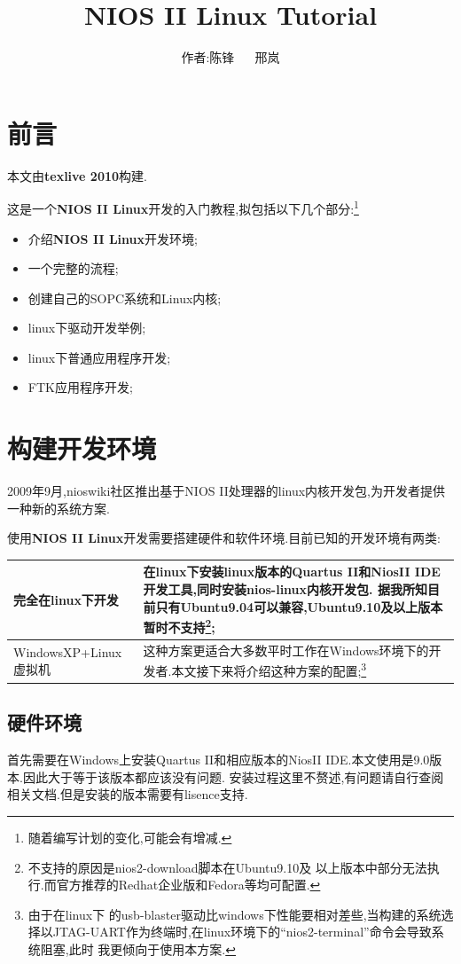 \documentclass[12pt,a4paper]{article}
\title{NIOS II Linux Tutorial}
\author{作者:陈锋 \ {}\ {} 邢岚}
\begin{document}
\thispagestyle{empty}
\maketitle{}
\section{前言}
本文由\textbf{texlive 2010}构建.

这是一个\textbf{NIOS II Linux}开发的入门教程,拟包括以下几个部分:\footnote{随着编写计划的变化,可能会有增减.}
\begin{itemize}
\item 介绍\textbf{NIOS II Linux}开发环境;
\item 一个完整的流程;
\item 创建自己的SOPC系统和Linux内核;
\item linux下驱动开发举例;
\item linux下普通应用程序开发;
\item FTK应用程序开发;
\end{itemize}
\newpage{}
\section{构建开发环境}
2009年9月,nioswiki社区推出基于NIOS II处理器的linux内核开发包,为开发者提供一种新的系统方案.

使用\textbf{NIOS II Linux}开发需要搭建硬件和软件环境.目前已知的开发环境有两类:
\begin{table}[!hbtp]
\centering
\begin{tabular}{|l|p{}|}
\hline
完全在linux下开发 & 在linux下安装linux版本的Quartus II和NiosII IDE开发工具,同时安装nios-linux内核开发包.
据我所知目前只有\textbf{Ubuntu9.04}可以兼容,Ubuntu9.10及以上版本暂时不支持\footnote{不支持的原因是nios2-download脚本在Ubuntu9.10及
以上版本中部分无法执行.而官方推荐的Redhat企业版和Fedora等均可配置.};\\
\hline
WindowsXP+Linux虚拟机 & 这种方案更适合大多数平时工作在Windows环境下的开发者.本文接下来将介绍这种方案的配置;\footnote{由于在linux下
的usb-blaster驱动比windows下性能要相对差些,当构建的系统选择以JTAG-UART作为终端时,在linux环境下的``nios2-terminal''命令会导致系统阻塞,此时
我更倾向于使用本方案.} \\
\hline
\end{tabular}
\end{table}
\subsection{硬件环境}
首先需要在Windows上安装Quartus II和相应版本的NiosII IDE.本文使用是9.0版本.因此大于等于该版本都应该没有问题.
安装过程这里不赘述,有问题请自行查阅相关文档.但是安装的版本{需要有lisence支持}.
\end{document}
